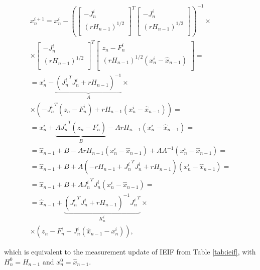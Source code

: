 \begin{align*}
x_n^{i + 1}= x_n^{i} - \left(
\left[
	\begin{array}{cc}
		- J_n^i \\
		\left(r H_{n - 1}\right)^{1/2} \\
	\end{array}
\right]^T 
\left[
	\begin{array}{c}
		- J_n^i \\
		\left(r H_{n - 1}\right)^{1/2} \\
	\end{array}
\right]
\right)^{-1} \times\\
\times \left[
	\begin{array}{cc}
		- J_n^i \\
		\left(r H_{n - 1}\right)^{1/2} \\
	\end{array}
\right]^T 
\left[
	\begin{array}{c}
		z_n - F_n^i \\
		\left(r H_{n - 1}\right)^{1/2}(x_n^i - \hat{x}_{n - 1}) \\
	\end{array}
\right] = \\
= x_n^{i} - \underbrace{\left({J_n^i}^T J_n^i + r H_{n - 1}\right)^{-1}}_{A} \times \\
\times \left( - {J_n^i}^T(z_n - F_n^i) + r H_{n - 1}(x_n^i - \hat{x}_{n - 1})\right)  = \\
= x_n^i +\underbrace{A {J_n^i}^T(z_n - F_n^i)}_B - A r H_{n - 1}(x_n^i - \hat{x}_{n - 1})  = \\
= \hat{x}_{n - 1} + B  - A r H_{n - 1}(x_n^i - \hat{x}_{n - 1}) + A A^{-1}( x_n^i - \hat{x}_{n - 1}) = \\
= \hat{x}_{n - 1} + B + A(- r H_{n - 1} + {J_n^i}^T J_n^i + r H_{n - 1})(x_n^i - \hat{x}_{n - 1}) = \\
= \hat{x}_{n - 1} + B + A {J_n^i}^T J_n^i (x_n^i - \hat{x}_{n - 1}) = \\
= \hat{x}_{n - 1} + \underbrace{\left({J_n^i}^T J_n^i + r H_{n - 1}\right)^{-1} {J_n^i}^T}_{K_n^i} \times \\
\times (z_n - F_n^i - J_n^i (\hat{x}_{n - 1} - x_n^i)),
 \end{align*}
 
 which is equivalent to the measurement update of IEIF from Table \ref{tab:ieif}, with $H_n^0 = H_{n-1}$ and $x_n^0 = \hat{x}_{n - 1}$.